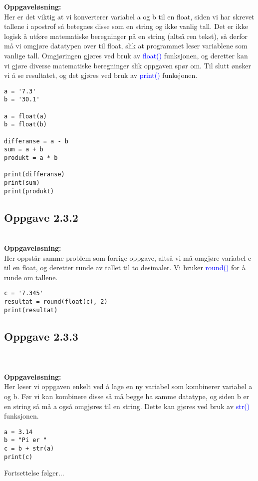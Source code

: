 \textbf{Oppgaveløsning:}\\
Her er det viktig at vi konverterer variabel {\ttfamily a} og {\ttfamily b} til en float, siden vi har skrevet tallene i apostrof så betegnes disse som en string og ikke vanlig tall. Det er ikke logisk å utføre matematiske beregninger på en string (altså ren tekst), så derfor må vi omgjøre datatypen over til float, slik at programmet leser variablene som vanlige tall. Omgjøringen gjøres ved bruk av {\ttfamily\textcolor{blue}{float()}} funksjonen, og deretter kan vi gjøre diverse matematiske beregninger slik oppgaven spør om. Til slutt ønsker vi å se resultatet, og det gjøres ved bruk av {\ttfamily\textcolor{blue}{print()}} funksjonen.

\begin{lstlisting}
a = '7.3'
b = '30.1'

a = float(a)
b = float(b)

differanse = a - b
sum = a + b
produkt = a * b

print(differanse)
print(sum)
print(produkt)
\end{lstlisting}

\subsection{Oppgave 2.3.2}
\\

\textbf{Oppgaveløsning:}\\
Her oppstår samme problem som forrige oppgave, altså vi må omgjøre variabel {\ttfamily c} til en float, og deretter runde av tallet til to desimaler. Vi bruker {\ttfamily\textcolor{blue}{round()}} for å runde om tallene.

\begin{lstlisting}
c = '7.345'
resultat = round(float(c), 2)
print(resultat)
\end{lstlisting}

\subsection{Oppgave 2.3.3}
\\\\

\textbf{Oppgaveløsning:}\\
Her løser vi oppgaven enkelt ved å lage en ny variabel som kombinerer variabel {\ttfamily a} og {\ttfamily b}. Før vi kan kombinere disse så må begge ha samme datatype, og siden {\ttfamily b} er en string så må {\ttfamily a} også omgjøres til en string. Dette kan gjøres ved bruk av {\ttfamily\textcolor{blue}{str()}} funksjonen.

\begin{lstlisting}
a = 3.14
b = "Pi er "
c = b + str(a)
print(c)
\end{lstlisting}

Fortsettelse følger...